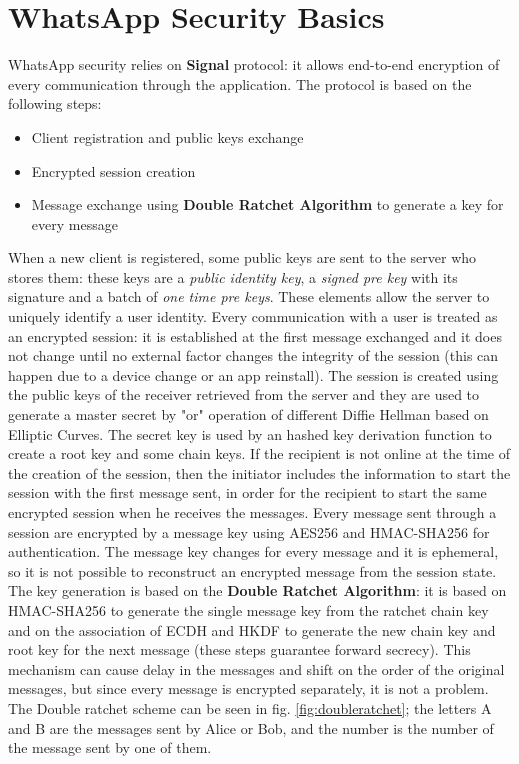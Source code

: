\documentclass{article}
\begin{document}

\section{WhatsApp Security Basics}

WhatsApp security relies on \textbf{Signal} protocol: it allows end-to-end encryption of every communication through the application. The protocol is based on the following steps:

\begin{itemize}
	\item Client registration and public keys exchange
	\item Encrypted session creation
	\item Message exchange using \textbf{Double Ratchet Algorithm} to generate a key for every message
\end{itemize}

When a new client is registered, some public keys are sent to the server who stores them: these keys are a \textit{public identity key}, a \textit{signed pre key} with its signature and a batch of \textit{one time pre keys}. These elements allow the server to uniquely identify a user identity.\newline
Every communication with a user is treated as an encrypted session: it is established at the first message exchanged and it does not change until no external factor changes the integrity of the session (this can happen due to a device change or an app reinstall). The session is created using the public keys of the receiver retrieved from the server and they are used to generate a master secret by "or" operation of different Diffie Hellman based on Elliptic Curves. The secret key is used by an hashed key derivation function to create a root key and some chain keys. If the recipient is not online at the time of the creation of the session, then the initiator includes the information to start the session with the first message sent, in order for the recipient to start the same encrypted session when he receives the messages.\newline
Every message sent through a session are encrypted by a message key using AES256 and HMAC-SHA256 for authentication. The message key changes for every message and it is ephemeral, so it is not possible to reconstruct an encrypted message from the session state. The key generation is based on the \textbf{Double Ratchet Algorithm}: it is based on HMAC-SHA256 to generate the single message key from the ratchet chain key and on the association of ECDH and HKDF to generate the new chain key and root key for the next message (these steps guarantee forward secrecy). This mechanism can cause delay in the messages and shift on the order of the original messages, but since every message is encrypted separately, it is not a problem. The Double ratchet scheme can be seen in fig. \ref{fig:doubleratchet}; the letters A and B are the messages sent by Alice or Bob, and the number is the number of the message sent by one of them.
\end{document}
